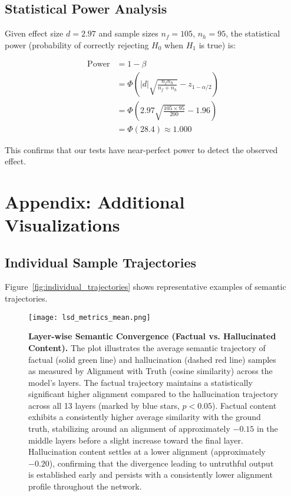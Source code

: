 \documentclass[11pt]{article}
\begin{document}
\subsection{Statistical Power Analysis}

Given effect size $d = 2.97$ and sample sizes $n_f = 105$, $n_h = 95$, the statistical power (probability of correctly rejecting $H_0$ when $H_1$ is true) is:

\begin{align}
\text{Power} &= 1 - \beta \\
&= \Phi\left( |d| \sqrt{\frac{n_f n_h}{n_f + n_h}} - z_{1-\alpha/2} \right) \\
&= \Phi\left( 2.97 \sqrt{\frac{105 \times 95}{200}} - 1.96 \right) \\
&= \Phi(28.4) \approx 1.000
\end{align}

This confirms that our tests have near-perfect power to detect the observed effect.

\section{Appendix: Additional Visualizations}
\label{app:viz}

\subsection{Individual Sample Trajectories}

Figure~\ref{fig:individual_trajectories} shows representative examples of semantic trajectories.

\begin{figure}[h]
\centering
\texttt{[image: lsd\_metrics\_mean.png]}
\caption{\textbf{Layer-wise Semantic Convergence (Factual vs. Hallucinated Content).}
The plot illustrates the average semantic trajectory of factual (solid green line) and hallucination (dashed red line) samples as measured by Alignment with Truth (cosine similarity) across the model's layers.
The factual trajectory maintains a statistically significant higher alignment compared to the hallucination trajectory across all 13 layers (marked by blue stars, $p < 0.05$).
Factual content exhibits a consistently higher average similarity with the ground truth, stabilizing around an alignment of approximately $-0.15$ in the middle layers before a slight increase toward the final layer.
Hallucination content settles at a lower alignment (approximately $-0.20$), confirming that the divergence leading to untruthful output is established early and persists with a consistently lower alignment profile throughout the network.}

\label{fig:lsd_metrics_mean}
\end{figure}
\end{document}
